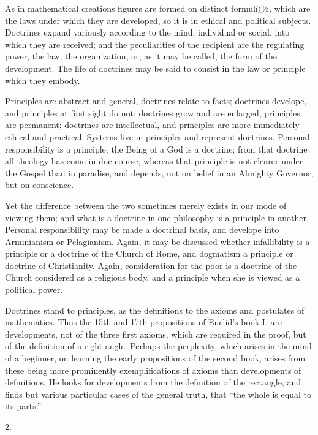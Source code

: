 
As in mathematical creations figures are formed on
distinct formulï¿½, which are the laws under which they
are developed, so it is in ethical and political
subjects. Doctrines expand variously according to the
mind, individual or social, into which they are received;
and the peculiarities of the recipient are the regulating
power, the law, the organization, or, as it may be
called, the form of the development. The life of
doctrines may be said to consist in the law or principle
which they embody.

Principles are abstract and general, doctrines relate
to facts; doctrines develope, and principles at first
sight do not; doctrines grow and are enlarged, principles
are permanent; doctrines are intellectual, and principles
are more immediately ethical and practical. Systems live
in principles and represent doctrines. Personal
responsibility is a principle, the Being of a God is a
doctrine; from that doctrine all theology has come in due
course, whereas that principle is not clearer under the
Gospel than in paradise, and depends, not on belief in an
Almighty Governor, but on conscience.

Yet the difference between the two sometimes merely
exists in our mode of viewing them; and what is a
doctrine in one philosophy is a principle in another.
Personal responsibility may be made a doctrinal basis,
and develope into Arminianism or Pelagianism. Again, it
may be discussed whether infallibility is a principle or
a doctrine of the Church of Rome, and dogmatism a
principle or doctrine of Christianity. Again,
consideration for the poor is a doctrine of the Church
considered as a religious body, and a principle when she
is viewed as a political power.

Doctrines stand to principles, as the definitions to
the axioms and postulates of mathematics. Thus the 15th
and 17th propositions of Euclid's book I. are
developments, not of the three first axioms, which are
required in the proof, but of the definition of a right
angle. Perhaps the perplexity, which arises in the mind
of a beginner, on learning the early propositions of the
second book, arises from these being more prominently
exemplifications of axioms than developments of
definitions. He looks for developments from the
definition of the rectangle, and finds but various
particular cases of the general truth, that ``the
whole is equal to its parts.''

2.

